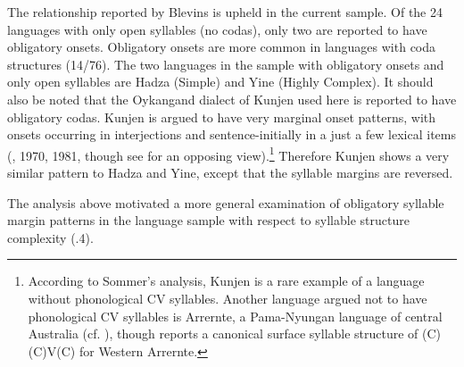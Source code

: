   The relationship reported by Blevins is upheld in the current sample. Of the 24 languages with only open syllables (no codas), only two are reported to have obligatory onsets. Obligatory onsets are more common in languages with coda structures (14/76). The two languages in the sample with obligatory onsets and only open syllables are Hadza (Simple) and Yine (Highly Complex). It should also be noted that the Oykangand dialect of Kunjen used here is reported to have obligatory codas. Kunjen is argued to have very marginal onset patterns, with onsets occurring in interjections and sentence-initially in a just a few lexical items (\citealt{Sommer1969}, 1970, 1981, though see \citealt{Dixon1970} for an opposing view).\footnote{ \textrm{According to Sommer’s analysis, Kunjen is a rare example of a language without phonological CV syllables. Another language argued not to have phonological CV syllables is Arrernte, a Pama-Nyungan language of central Australia (cf. \citealt{BreenPensalfini1999}), though \citet{Anderson2000} reports a canonical surface syllable structure of (C)(C)V(C) for Western Arrernte.}} Therefore Kunjen shows a very similar pattern to Hadza and Yine, except that the syllable margins are reversed.

  The analysis above motivated a more general examination of obligatory syllable margin patterns in the language sample with respect to syllable structure complexity (.4).

